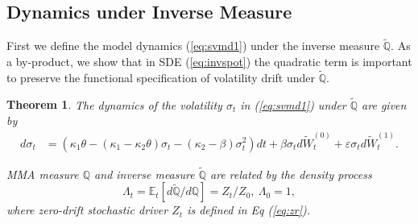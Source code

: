 \documentclass[11pt,a4paper] {article}
\newtheorem{theorem}{Theorem}[section]
\begin{document}
\subsection{Dynamics under Inverse Measure}\label{sc:emma}


First we define the model dynamics (\ref{eq:svmd1}) under the inverse measure $\mathbb{\tilde{Q}}$. As a by-product, we show that in SDE (\ref{eq:invspot}) the quadratic term is important to preserve the functional specification of volatility drift under $\mathbb{\tilde{Q}}$. 

\begin{theorem}\label{thm:inverse_meas}
The dynamics of the volatility $\sigma_{t}$ in (\ref{eq:svmd1}) under $\mathbb{\tilde{Q}}$ are given by
\begin{equation}\label{eq:invspot}
\begin{split}
d\sigma_{t}& =\left(\kappa_{1} \theta - \left(\kappa_{1} - \kappa_{2}\theta \right)\sigma_{t}- \left(\kappa_{2}-\beta\right)\sigma_{t}^{2} \right)dt+  \beta  \sigma_{t}d\widetilde W^{(0)}_{t} +  \varepsilon \sigma_{t} d\widetilde W^{(1)}_{t}.
\end{split}
\end{equation}

MMA measure $\mathbb{Q}$ and inverse measure $\tilde{\mathbb{Q}}$ are related by the density process
\begin{equation}\label{eq:dens_process}
\Lambda_t=\mathbb{E}_t\left[d\tilde{\mathbb{Q}}/d\mathbb{Q}\right]=Z_t/Z_0, \ \Lambda_{0}=1,
\end{equation}
where zero-drift stochastic driver $Z_t$ is defined in Eq (\ref{eq:zr}).
\end{theorem}
\end{document}
